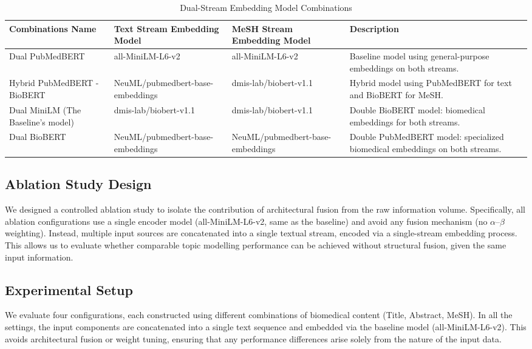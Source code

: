 \documentclass[authorproof,JACIII,researchpaper]{fujipressarticle}
\begin{document}
\begin{table}[!ht]
\caption{Dual-Stream Embedding Model Combinations}
\label{tab:model_combinations}
\centering
\renewcommand{\arraystretch}{1.3}
\begin{tabular}{p{3.2cm}p{4.2cm}p{4cm}p{4.8cm}}
\hline
\textbf{Combinations Name} & \textbf{Text Stream Embedding Model} & \textbf{MeSH Stream Embedding Model} & \textbf{Description} \\
\hline
Dual PubMedBERT & all-MiniLM-L6-v2 & all-MiniLM-L6-v2 & Baseline model using general-purpose embeddings on both streams. \\
\hline
Hybrid PubMedBERT - BioBERT & NeuML/pubmedbert-base-embeddings & dmis-lab/biobert-v1.1 & Hybrid model using PubMedBERT for text and BioBERT for MeSH. \\
\hline
Dual MiniLM (The Baseline's model) & dmis-lab/biobert-v1.1 & dmis-lab/biobert-v1.1 & Double BioBERT model: biomedical embeddings for both streams. \\
\hline
Dual BioBERT & NeuML/pubmedbert-base-embeddings & NeuML/pubmedbert-base-embeddings & Double PubMedBERT model: specialized biomedical embeddings on both streams. \\
\hline
\end{tabular}
\end{table}

\subsection{Ablation Study Design}

We designed a controlled ablation study to isolate the contribution of architectural fusion from the raw information volume. Specifically, all ablation configurations use a single encoder model (all-MiniLM-L6-v2, same as the baseline) and avoid any fusion mechanism (no $\alpha$--$\beta$ weighting). Instead, multiple input sources are concatenated into a single textual stream, encoded via a single-stream embedding process. This allows us to evaluate whether comparable topic modelling performance can be achieved without structural fusion, given the same input information.

\subsection{Experimental Setup}

We evaluate four configurations, each constructed using different combinations of biomedical content (Title, Abstract, MeSH). In all the settings, the input components are concatenated into a single text sequence and embedded via the baseline model (all-MiniLM-L6-v2). This avoids architectural fusion or weight tuning, ensuring that any performance differences arise solely from the nature of the input data.
\end{document}

